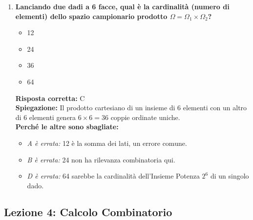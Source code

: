 \documentclass[12pt, a4paper]{article}
\begin{document}
\begin{enumerate}[label=\textbf{\arabic*.}]
    \item \textbf{Lanciando due dadi a 6 facce, qual è la cardinalità (numero di elementi) dello spazio campionario prodotto $\Omega = \Omega_1 \times \Omega_2$?}
    \begin{itemize}
        \item[A)] 12
        \item[B)] 24
        \item[C)] 36
        \item[D)] 64
    \end{itemize}
    \textbf{Risposta corretta:} C \\
    \textbf{Spiegazione:} Il prodotto cartesiano di un insieme di 6 elementi con un altro di 6 elementi genera $6 \times 6 = 36$ coppie ordinate uniche. \\
    \textbf{Perché le altre sono sbagliate:}
    \begin{itemize}
        \item \textit{A è errata:} 12 è la somma dei lati, un errore comune.
        \item \textit{B è errata:} 24 non ha rilevanza combinatoria qui.
        \item \textit{D è errata:} 64 sarebbe la cardinalità dell'Insieme Potenza $2^6$ di un singolo dado.
    \end{itemize}
\end{enumerate}

\subsection*{Lezione 4: Calcolo Combinatorio}
\end{document}
